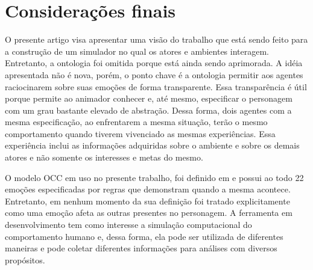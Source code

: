 \chapter{Considerações finais}


O presente artigo visa apresentar uma visão do trabalho que está sendo feito
para a construção de um simulador no qual os atores e ambientes interagem.
Entretanto, a ontologia foi omitida porque está ainda sendo aprimorada.  A
idéia apresentada não é nova, porém, o ponto chave é a ontologia permitir aos
agentes raciocinarem sobre suas emoções de forma transparente.  Essa
transparência é útil porque permite ao animador conhecer e, até mesmo,
especificar o personagem com um grau bastante elevado de abstração.
%
Dessa forma, dois agentes com a mesma especificação, ao enfrentarem a mesma
situação, terão o mesmo comportamento quando tiverem vivenciado as mesmas
experiências. Essa experiência inclui as informações adquiridas sobre o
ambiente e sobre os demais atores e não somente os interesses e metas do
mesmo.

O modelo OCC em uso no presente trabalho, foi definido em
\citeyear{ortony1988cse} e possui ao todo 22 emoções especificadas por regras
que demonstram quando a mesma acontece. Entretanto, em nenhum momento da sua
definição foi tratado explicitamente como uma emoção afeta as outras presentes
no personagem.
%
A ferramenta em desenvolvimento tem como interesse a simulação computacional
do comportamento humano e, dessa forma, ela pode ser utilizada de diferentes
maneiras e pode coletar diferentes informações para análises com diversos
propósitos.
